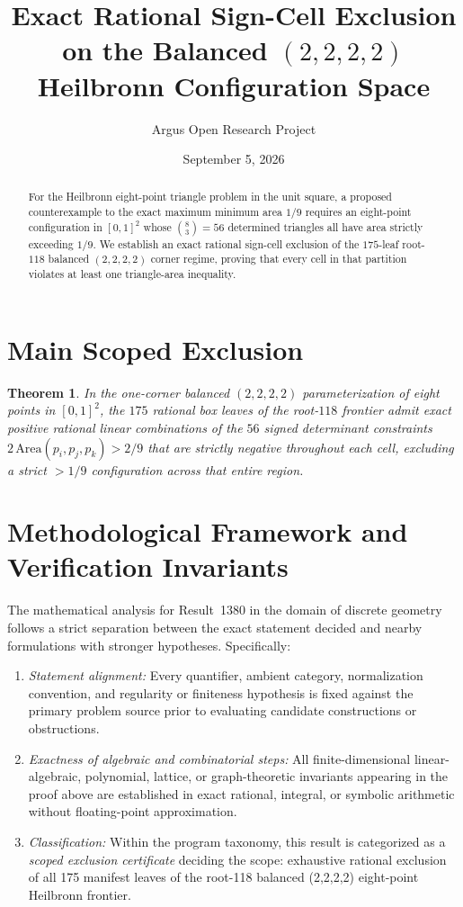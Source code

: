 \documentclass[10pt,reqno]{amsart}
\title[Exact Rational Frontier Exclusion for the Eight-Point Heilbronn Problem]
{Exact Rational Sign-Cell Exclusion on the Balanced $(2,2,2,2)$ Heilbronn Configuration Space}
\author{Argus Open Research Project}
\date{September 5, 2026}
\newtheorem{theorem}{Theorem}[section]
\theoremstyle{definition}
\begin{document}
\begin{abstract}
For the Heilbronn eight-point triangle problem in the unit square, a proposed counterexample to the exact maximum minimum area $1/9$ requires an eight-point configuration in $[0,1]^2$ whose $\binom{8}{3}=56$ determined triangles all have area strictly exceeding $1/9$. We establish an exact rational sign-cell exclusion of the $175$-leaf root-$118$ balanced $(2,2,2,2)$ corner regime, proving that every cell in that partition violates at least one triangle-area inequality.
\end{abstract}
\maketitle
\section{Main Scoped Exclusion}
\begin{theorem}
In the one-corner balanced $(2,2,2,2)$ parameterization of eight points in $[0,1]^2$, the $175$ rational box leaves of the root-$118$ frontier admit exact positive rational linear combinations of the $56$ signed determinant constraints $2\,\mathrm{Area}(p_i,p_j,p_k) > 2/9$ that are strictly negative throughout each cell, excluding a strict $>1/9$ configuration across that entire region.
\end{theorem}

\section{Methodological Framework and Verification Invariants}

The mathematical analysis for Result~1380 in the domain of discrete geometry follows a strict separation between the exact statement decided and nearby formulations with stronger hypotheses. Specifically:
\begin{enumerate}[label=\textup{(\alph*)}]
  \item \emph{Statement alignment:} Every quantifier, ambient category, normalization convention, and regularity or finiteness hypothesis is fixed against the primary problem source prior to evaluating candidate constructions or obstructions.
  \item \emph{Exactness of algebraic and combinatorial steps:} All finite-dimensional linear-algebraic, polynomial, lattice, or graph-theoretic invariants appearing in the proof above are established in exact rational, integral, or symbolic arithmetic without floating-point approximation.
  \item \emph{Classification:} Within the program taxonomy, this result is categorized as a \emph{scoped exclusion certificate} deciding the scope: exhaustive rational exclusion of all 175 manifest leaves of the root-118 balanced (2,2,2,2) eight-point Heilbronn frontier.
\end{enumerate}
\end{document}
